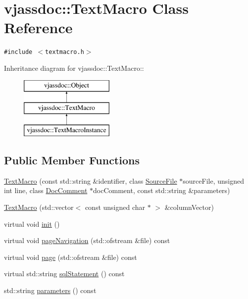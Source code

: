 \hypertarget{classvjassdoc_1_1TextMacro}{
\section{vjassdoc::TextMacro Class Reference}
\label{classvjassdoc_1_1TextMacro}
}
{\tt \#include $<$textmacro.h$>$}

Inheritance diagram for vjassdoc::TextMacro::\begin{figure}[H]
\begin{center}
\leavevmode
\includegraphics[height=3cm]{classvjassdoc_1_1TextMacro}
\end{center}
\end{figure}
\subsection*{Public Member Functions}
\begin{CompactItemize}
\item 
\hyperlink{classvjassdoc_1_1TextMacro_7354fb20a513ca489afe554896f039ef}{TextMacro} (const std::string \&identifier, class \hyperlink{classvjassdoc_1_1SourceFile}{SourceFile} $\ast$sourceFile, unsigned int line, class \hyperlink{classvjassdoc_1_1DocComment}{DocComment} $\ast$docComment, const std::string \&parameters)
\item 
\hyperlink{classvjassdoc_1_1TextMacro_c82712ca934e5a59bff730add064ec78}{TextMacro} (std::vector$<$ const unsigned char $\ast$ $>$ \&columnVector)
\item 
virtual void \hyperlink{classvjassdoc_1_1TextMacro_816bdd2b838a4f1148ea17e5723e8577}{init} ()
\item 
virtual void \hyperlink{classvjassdoc_1_1TextMacro_d3ad5fe5300492db3d1aaf250d9b2a4b}{pageNavigation} (std::ofstream \&file) const 
\item 
virtual void \hyperlink{classvjassdoc_1_1TextMacro_3336cdf9ad953dbd44b38fb14a2f73fa}{page} (std::ofstream \&file) const 
\item 
virtual std::string \hyperlink{classvjassdoc_1_1TextMacro_e46c88feedc6197fbbae48de17f07366}{sqlStatement} () const 
\item 
std::string \hyperlink{classvjassdoc_1_1TextMacro_33859a2be0f2da7633863fd06185f040}{parameters} () const 
\end{CompactItemize}


